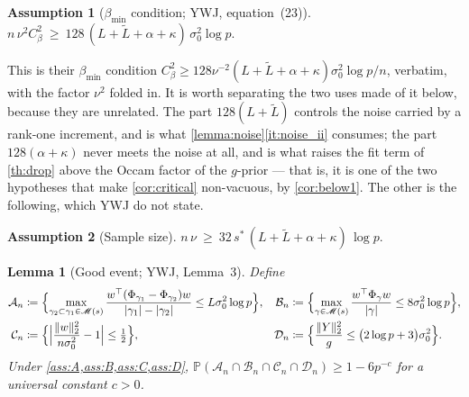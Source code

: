 \documentclass[aos]{imsart}
\DeclarePairedDelimiter{\norm}{\lVert}{\rVert}
\DeclarePairedDelimiter{\abs}{\lvert}{\rvert}
\newcommand{\Ltil}{\widetilde{L}}
\theoremstyle{plain}
\newtheorem{lemma}{Lemma}[section]
\theoremstyle{definition}
\newtheorem{assumption}{Assumption}[section]
\begin{document}
    \begin{assumption}[$\beta_{\min}$ condition; YWJ, equation~(23)]
        \label{ass:betamin}
        $n\,\nu^{2}C_\beta^{2}\ \geq\
        128\,(L+\Ltil+\alpha+\kappa)\,\sigma_0^{2}\log p$.
    \end{assumption}

    This is their $\beta_{\min}$ condition
    $C_\beta^{2}\geq128\nu^{-2}(L+\Ltil+\alpha+\kappa)
    \sigma_0^{2}\log p/n$, verbatim, with the factor $\nu^{2}$ folded in. It
    is worth separating the two uses made of it below, because they are
    unrelated. The part $128(L+\Ltil)$ controls the noise carried by a
    rank-one increment, and is what \cref{lemma:noise}\ref{it:noise_ii}
    consumes; the part $128(\alpha+\kappa)$ never meets the noise at all, and
    is what raises the fit term of \cref{th:drop} above the Occam factor of
    the $g$-prior --- that is, it is one of the two hypotheses that make
    \cref{cor:critical} non-vacuous, by \cref{cor:below1}. The other is the
    following, which YWJ do not state.

    \begin{assumption}[Sample size]
        \label{ass:nsize}
        $n\,\nu\ \geq\ 32\,s^{\ast}\,(L+\Ltil+\alpha+\kappa)\,\log p$.
    \end{assumption}

    \begin{lemma}[Good event; YWJ, Lemma~3]
        \label{lemma:good}
        Define
        \begin{align}
            \label{eq:events}
            \mathcal{A}_n&\coloneq\Bigl\{
            \max_{\gamma_2\subset\gamma_1\in\mathscr{M}(s)}
            \frac{w^{\top}(\Phi_{\gamma_1}-\Phi_{\gamma_2})w}
            {\abs{\gamma_1}-\abs{\gamma_2}}
            \leq L\sigma_0^{2}\log p\Bigr\},
            &
            \mathcal{B}_n&\coloneq\Bigl\{
            \max_{\gamma\in\mathscr{M}(s)}
            \frac{w^{\top}\Phi_\gamma w}{\abs{\gamma}}
            \leq 8\sigma_0^{2}\log p\Bigr\},
            \\
            \nonumber
            \mathcal{C}_n&\coloneq\Bigl\{
            \Bigl|\frac{\norm{w}_2^{2}}{n\sigma_0^{2}}-1
            \Bigr|\leq\tfrac12\Bigr\},
            &
            \mathcal{D}_n&\coloneq\Bigl\{
            \frac{\norm{Y}_2^{2}}{g}\leq
            \bigl(2\log p+3\bigr)\sigma_0^{2}\Bigr\} .
        \end{align}
        Under \cref{ass:A,ass:B,ass:C,ass:D},
        $\mathbb{P}(\mathcal{A}_n\cap\mathcal{B}_n\cap\mathcal{C}_n
        \cap\mathcal{D}_n)\geq1-6p^{-c}$ for a universal constant $c>0$.
    \end{lemma}
\end{document}
